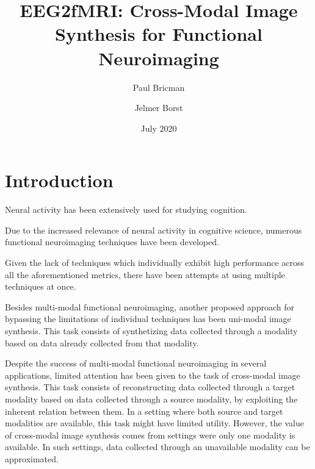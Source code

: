 \documentclass{article}
\title{EEG2fMRI: Cross-Modal Image Synthesis for Functional Neuroimaging}
\author{Paul Bricman}
\author{Jelmer Borst}
\affil{University of Groningen}
\date{July 2020}
\begin{document}
\maketitle

\section{Introduction}

Neural activity has been extensively used for studying cognition.

Due to the increased relevance of neural activity in cognitive science, numerous functional neuroimaging techniques have been developed.

Given the lack of techniques which individually exhibit high performance across all the aforementioned metrics, there have been attempts at using multiple techniques at once.

Besides multi-modal functional neuroimaging, another proposed approach for bypassing the limitations of individual techniques has been uni-modal image synthesis. This task consists of synthetizing data collected through a modality based on data already collected from that modality.

Despite the success of multi-modal functional neuroimaging in several applications, limited attention has been given to the task of cross-modal image synthesis. This task consists of reconstructing data collected through a target modality based on data collected through a source modality, by exploiting the inherent relation between them. In a setting where both source and target modalities are available, this task might have limited utility. However, the value of cross-modal image synthesis comes from settings were only one modality is available. In such settings, data collected through an unavailable modality can be approximated.
\end{document}
